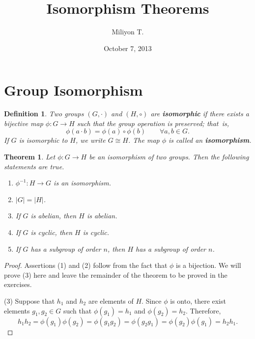 \documentclass[12pt]{article}
\newtheorem{thm}{Theorem}[section]
\theoremstyle{plain}
\newtheorem{definition}[theorem]{Definition}
\begin{document}
\nocite{}

\title{Isomorphism Theorems}

\author{Miliyon T.}
\date{October 7, 2013}
\maketitle
\section{Group Isomorphism}
\begin{definition}
Two groups $(G, \cdot)$ and $(H, \circ)$ are \textbf{isomorphic} if there exists a bijective map $\phi : G \rightarrow H$ such that the group operation is preserved;  that~is,
\[
\phi( a \cdot b) = \phi( a) \circ \phi( b)\qquad \forall a,b \in G.
\]
If $G$ is isomorphic to $H$, we write $G \cong H$. The map $\phi$ is called an \textbf{isomorphism}.
\end{definition}

\begin{thm}\label{isomorph_theorem_1}
Let $\phi : G \rightarrow H$ be an isomorphism of two groups.  Then the following statements are true.
\begin{enumerate}

\rm \item \it
$\phi^{-1} : H \rightarrow G$ is an isomorphism.

\rm \item \it
$|G| = |H|$.

\rm \item \it
If $G$ is abelian, then $H$ is abelian.

\rm \item \it
If $G$ is cyclic, then $H$ is cyclic.

\rm \item \it
If $G$ has a subgroup of order $n$, then $H$ has a subgroup of order $n$.

\end{enumerate}
\end{thm}

\begin{proof}
Assertions (1) and (2) follow from the fact that $\phi$ is a bijection.  We will prove (3) here and leave the remainder of the theorem to be proved in the exercises.

(3)
Suppose that $h_1$ and $h_2$ are elements of $H$.  Since $\phi$ is onto, there exist elements $g_1, g_2 \in G$ such that $\phi(g_1) = h_1$ and $\phi(g_2) = h_2$.  Therefore,
\[
h_1 h_2 = \phi(g_1) \phi(g_2) =  \phi(g_1 g_2) = \phi(g_2 g_1) = \phi(g_2) \phi(g_1) = h_2 h_1.
\]
\end{proof}
\end{document}
